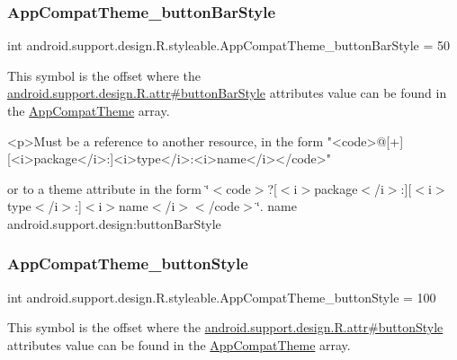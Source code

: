 \subsubsection{\texorpdfstring{App\+Compat\+Theme\+\_\+button\+Bar\+Style}{AppCompatTheme\_buttonBarStyle}}
{\footnotesize\ttfamily int android.\+support.\+design.\+R.\+styleable.\+App\+Compat\+Theme\+\_\+button\+Bar\+Style = 50\hspace{0.3cm}{\ttfamily [static]}}

This symbol is the offset where the \hyperlink{classandroid_1_1support_1_1design_1_1R_1_1attr_aa4640454ea301f1d5b7b31f4b2486d9f}{android.\+support.\+design.\+R.\+attr\#button\+Bar\+Style} attribute\textquotesingle{}s value can be found in the \hyperlink{classandroid_1_1support_1_1design_1_1R_1_1styleable_afb351dc8de20cbd4c89abe360373010c}{App\+Compat\+Theme} array.

\begin{DoxyVerb}      <p>Must be a reference to another resource, in the form "<code>@[+][<i>package</i>:]<i>type</i>:<i>name</i></code>"
\end{DoxyVerb}
 or to a theme attribute in the form \char`\"{}$<$code$>$?\mbox{[}$<$i$>$package$<$/i$>$\+:\mbox{]}\mbox{[}$<$i$>$type$<$/i$>$\+:\mbox{]}$<$i$>$name$<$/i$>$$<$/code$>$\char`\"{}.  name android.\+support.\+design\+:button\+Bar\+Style \mbox{\label{classandroid_1_1support_1_1design_1_1R_1_1styleable_ae0dbe579dfa57a5cbc98e488b1a7d61b}} 
\subsubsection{\texorpdfstring{App\+Compat\+Theme\+\_\+button\+Style}{AppCompatTheme\_buttonStyle}}
{\footnotesize\ttfamily int android.\+support.\+design.\+R.\+styleable.\+App\+Compat\+Theme\+\_\+button\+Style = 100\hspace{0.3cm}{\ttfamily [static]}}

This symbol is the offset where the \hyperlink{classandroid_1_1support_1_1design_1_1R_1_1attr_af1b31f0b5b93de1631dd3c9446564b39}{android.\+support.\+design.\+R.\+attr\#button\+Style} attribute\textquotesingle{}s value can be found in the \hyperlink{classandroid_1_1support_1_1design_1_1R_1_1styleable_afb351dc8de20cbd4c89abe360373010c}{App\+Compat\+Theme} array.

